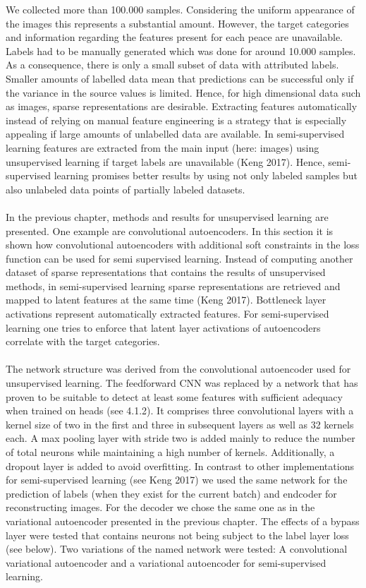 We collected more than 100.000 samples. Considering the uniform appearance of the images this represents a substantial amount. However, the target categories and information regarding the features present for each peace are unavailable. Labels had to be manually generated which was done for around 10.000 samples. As a consequence, there is only a small subset of data with attributed labels. Smaller amounts of labelled data mean that predictions can be successful only if the variance in the source values is limited. Hence, for high dimensional data such as images, sparse representations are desirable. Extracting features automatically instead of relying on manual feature engineering is a strategy that is especially appealing if large amounts of unlabelled data are available. In semi-supervised learning features are extracted from the main input (here: images) using unsupervised learning if target labels are unavailable (Keng 2017). Hence, semi-supervised learning promises better results by using not only labeled samples but also unlabeled data points of partially labeled datasets.\\
\\
In the previous chapter, methods and results for unsupervised learning are presented. One example are convolutional autoencoders. In this section it is shown how convolutional autoencoders with additional soft constraints in the loss function can be used for semi supervised learning. Instead of computing another dataset of sparse representations that contains the results of unsupervised methods, in semi-supervised learning sparse representations are retrieved and mapped to latent features at the same time (Keng 2017). Bottleneck layer activations represent automatically extracted features. For semi-supervised learning one tries to enforce that latent layer activations of autoencoders correlate with the target categories. \\
\\
The network structure was derived from the convolutional autoencoder used for unsupervised learning. The feedforward CNN was replaced by a network that has proven to be suitable to detect at least some features with sufficient adequacy when trained on heads (see 4.1.2). It comprises three convolutional layers with a kernel size of two in the first and three in subsequent layers as well as 32 kernels each. A max pooling layer with stride two is added mainly to reduce the number of total neurons while maintaining a high number of kernels. Additionally, a dropout layer is added to avoid overfitting. In contrast to other implementations for semi-supervised learning (see Keng 2017)  we used the same network for the prediction of labels (when they exist for the current batch) and endcoder for reconstructing images. For the decoder we chose the same one as in the variational autoencoder presented in the previous chapter. The effects of a bypass layer were tested that contains neurons not being subject to the label layer loss (see below). Two variations of the named network were tested: A convolutional variational autoencoder and a variational autoencoder for semi-supervised learning.\\
